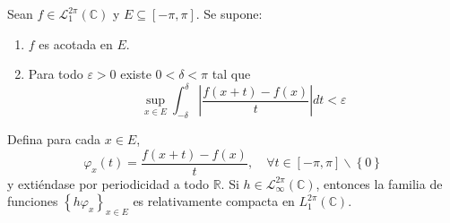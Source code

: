 \documentclass[12pt]{report}
\newcounter{it}
\theoremstyle{largebreak}
\newcommand\abs[1]{\ensuremath{\left|#1\right|}}
\begin{document}
    \begin{lema}
        Sean $f\in\mathcal{L}_1^{2\pi}(\mathbb{C})$ y $E\subseteq[-\pi,\pi]$. Se supone:
        \begin{enumerate}
            \item $f$ es acotada en $E$.
            \item Para todo $\varepsilon>0$ existe $0<\delta<\pi$ tal que
            \begin{equation*}
                \sup_{ x\in E}\int_{-\delta}^{\delta}\abs{\frac{f(x+t)-f(x)}{t}}dt<\varepsilon
            \end{equation*}
        \end{enumerate}
        Defina para cada $x\in E$,
        \begin{equation*}
            \varphi_x(t)=\frac{f(x+t)-f(x)}{t},\quad\forall t\in[-\pi,\pi]\backslash\left\{0 \right\}
        \end{equation*}
        y extiéndase por periodicidad a todo $\mathbb{R}$. Si $h\in\mathcal{L}_{\infty}^{2\pi}(\mathbb{C})$, entonces la familia de funciones $\left\{h\varphi_x \right\}_{x\in E}$ es relativamente compacta en $L_1^{2\pi}(\mathbb{C})$.
    \end{lema}
\end{document}
